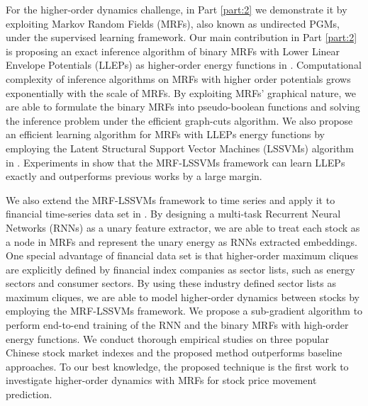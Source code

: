 For the higher-order dynamics challenge, in Part \ref{part:2} we
demonstrate it by exploiting Markov Random Fields (MRFs), also
known as undirected PGMs, under the supervised learning
framework. Our main contribution in Part \ref{part:2} is
proposing an exact inference algorithm of binary MRFs with Lower
Linear Envelope Potentials (LLEPs) as higher-order energy
functions in . Computational
complexity of inference algorithms on MRFs with higher order
potentials grows exponentially with the scale of MRFs. By
exploiting MRFs' graphical nature, we are able to formulate the
binary MRFs into pseudo-boolean functions and solving the
inference problem under the efficient graph-cuts algorithm. We
also propose an efficient learning algorithm for MRFs with LLEPs
energy functions by employing the Latent Structural Support
Vector Machines (LSSVMs) algorithm in .
Experiments in  show that the MRF-LSSVMs
framework can learn LLEPs exactly and outperforms previous works
by a large margin.

We also extend the MRF-LSSVMs framework to time series and apply
it to financial time-series data set in
. By designing a multi-task Recurrent
Neural Networks (RNNs) as a unary feature extractor, we are able
to treat each stock as a node in MRFs and represent the unary
energy as RNNs extracted embeddings. One special advantage of
financial data set is that higher-order maximum cliques are
explicitly defined by financial index companies as sector lists,
such as energy sectors and consumer sectors. By using these
industry defined sector lists as maximum cliques, we are able to
model higher-order dynamics between stocks by employing the
MRF-LSSVMs framework. We propose a sub-gradient algorithm to
perform end-to-end training of the RNN and the binary MRFs with
high-order energy functions. We conduct thorough empirical
studies on three popular Chinese stock market indexes and the
proposed method outperforms baseline approaches. To our best
knowledge, the proposed technique is the first work to
investigate higher-order dynamics with MRFs for stock price
movement prediction.

